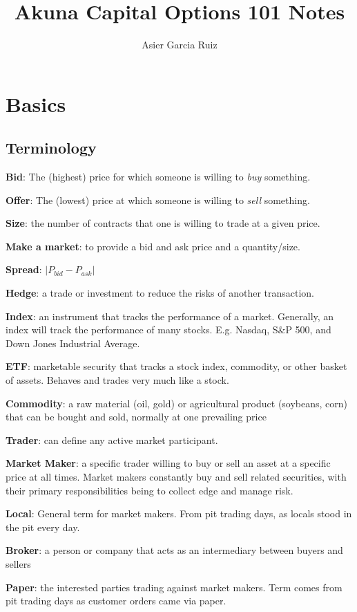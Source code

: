\documentclass{article}
\title{Akuna Capital Options 101 Notes}
\author{Asier Garcia Ruiz}
\begin{document}
\maketitle

\section{Basics}
\subsection{Terminology}
\textbf{Bid}: The (highest) price for which someone is willing to \textit{buy} something.

\textbf{Offer}: The (lowest) price at which someone is willing to \textit{sell} something.

\textbf{Size}: the number of contracts that one is willing to trade at a given price.

\textbf{Make a market}: to provide a bid and ask price and a quantity/size.

\textbf{Spread}: $|P_{bid} - P_{ask}|$

\textbf{Hedge}: a trade or investment to reduce the risks of another transaction.

\textbf{Index}: an instrument that tracks the performance of a market.
Generally, an index will track the performance of many stocks.
E.g. Nasdaq, S\&P 500, and Down Jones Industrial Average.

\textbf{ETF}: marketable security that tracks a stock index, commodity, or other
basket of assets. Behaves and trades very much like a stock.

\textbf{Commodity}: a raw material (oil, gold) or agricultural product 
(soybeans, corn) that can be bought and sold, normally at one prevailing price

\textbf{Trader}: can define any active market participant.

\textbf{Market Maker}: a specific trader willing to buy or sell an asset at a specific
price at all times. Market makers constantly buy and sell related securities,
with their primary responsibilities being to collect edge and manage risk.

\textbf{Local}: General term for market makers. From pit trading days, as locals 
stood in the pit every day.

\textbf{Broker}: a person or company that acts as an intermediary between buyers 
and sellers

\textbf{Paper}: the interested parties trading against market makers. Term
comes from pit trading days as customer orders came via paper.
\end{document}
